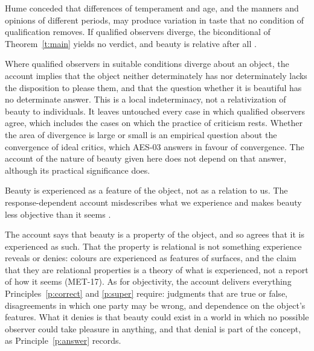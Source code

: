 \documentclass{situationist-preprint}
\begin{document}
\begin{objection}[Divergence]\label{o:div}
Hume conceded that differences of temperament and age, and the manners and opinions of different periods, may produce variation in taste that no condition of qualification removes. If qualified observers diverge, the biconditional of Theorem~\ref{t:main} yields no verdict, and beauty is relative after all \citep{Goldman1995,Levinson2001}.
\end{objection}

\begin{reply}
Where qualified observers in suitable conditions diverge about an object, the account implies that the object neither determinately has nor determinately lacks the disposition to please them, and that the question whether it is beautiful has no determinate answer. This is a local indeterminacy, not a relativization of beauty to individuals. It leaves untouched every case in which qualified observers agree, which includes the cases on which the practice of criticism rests. Whether the area of divergence is large or small is an empirical question about the convergence of ideal critics, which AES-03 answers in favour of convergence. The account of the nature of beauty given here does not depend on that answer, although its practical significance does.
\end{reply}

\begin{objection}[Phenomenology]\label{o:zang}
Beauty is experienced as a feature of the object, not as a relation to us. The response-dependent account misdescribes what we experience and makes beauty less objective than it seems \citep{Zangwill2001}.
\end{objection}

\begin{reply}
The account says that beauty is a property of the object, and so agrees that it is experienced as such. That the property is relational is not something experience reveals or denies: colours are experienced as features of surfaces, and the claim that they are relational properties is a theory of what is experienced, not a report of how it seems (MET-17). As for objectivity, the account delivers everything Principles~\ref{p:correct} and \ref{p:super} require: judgments that are true or false, disagreements in which one party may be wrong, and dependence on the object's features. What it denies is that beauty could exist in a world in which no possible observer could take pleasure in anything, and that denial is part of the concept, as Principle~\ref{p:answer} records.
\end{reply}
\end{document}
